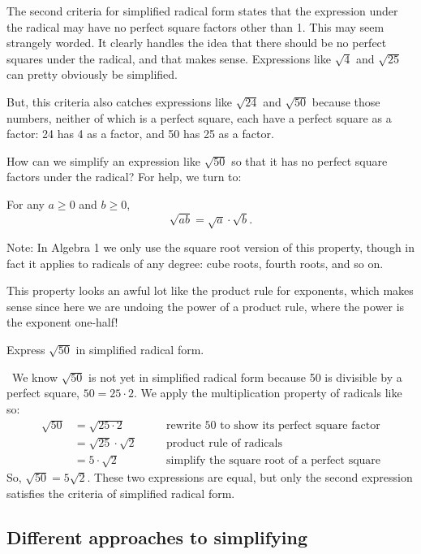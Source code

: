 The second criteria for simplified radical form states that the expression under the radical may have no perfect square factors other than 1. This may seem strangely worded. It clearly handles the idea that there should be no perfect squares under the radical, and that makes sense. Expressions like $\sqrt{4}$ and $\sqrt{25}$ can pretty obviously be simplified.

But, this criteria also catches expressions like $\sqrt{24}$ and $\sqrt{50}$ because those numbers, neither of which is a perfect square, each have a perfect square as a factor: 24 has 4 as a factor, and 50 has 25 as a factor.

How can we simplify an expression like $\sqrt{50}$ so that it has no perfect square factors under the radical? For help, we turn to:

\begin{boxdef}
For any $a \geq 0$ and $b \geq 0$, \[\sqrt{ab} = \sqrt{a} \cdot \sqrt{b}.\]

Note: In Algebra 1 we only use the square root version of this property, though in fact it applies to radicals of any degree: cube roots, fourth roots, and so on.
\end{boxdef}

This property looks an awful lot like the product rule for exponents, which makes sense since here we are undoing the power of a product rule, where the power is the exponent one-half!

\begin{boxex}
Express $\sqrt{50}$ in simplified radical form.

\exsoln\ We know $\sqrt{50}$ is not yet in simplified radical form because 50 is divisible by a perfect square, $50 = 25 \cdot 2$. We apply the multiplication property of radicals like so:
\[
\begin{aligned}
\sqrt{50} 	&= \sqrt{25 \cdot 2}
&& \quad \text{rewrite 50 to show its perfect square factor}\\
			&= \sqrt{25} \cdot \sqrt{2}
&& \quad \text{product rule of radicals}\\
			&= 5 \cdot \sqrt{2}
&& \quad \text{simplify the square root of a perfect square}
\end{aligned}
\]
So, $\sqrt{50} = 5\sqrt{2}$. These two expressions are equal, but only the second expression satisfies the criteria of simplified radical form.
\end{boxex}

\subsection{Different approaches to simplifying}


